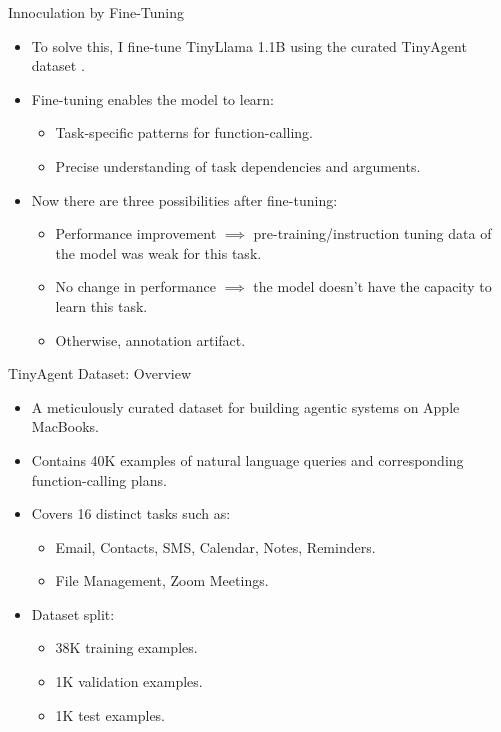 \documentclass{beamer}
\begin{document}
\begin{frame}{Innoculation by Fine-Tuning}
    \begin{itemize}
        \item To solve this, I fine-tune TinyLlama 1.1B using the curated TinyAgent dataset \citep{erdogan2024tinyagent}.
        \item Fine-tuning enables the model to learn:
        \begin{itemize}
            \item Task-specific patterns for function-calling.
            \item Precise understanding of task dependencies and arguments.
        \end{itemize}
        \item Now there are three possibilities after fine-tuning:
        \begin{itemize}
            \item Performance improvement \(\implies \) pre-training/instruction tuning data of the model was weak for this task.
            \item No change in performance \(\implies \) the model doesn't have the capacity to learn this task.
            \item Otherwise, annotation artifact.
        \end{itemize}
    \end{itemize}
\end{frame}

\begin{frame}{TinyAgent Dataset: Overview}
    \begin{itemize}
        \item A meticulously curated dataset for building agentic systems on Apple MacBooks.
        \item Contains 40K examples of natural language queries and corresponding function-calling plans.
        \item Covers 16 distinct tasks such as:
        \begin{itemize}
            \item Email, Contacts, SMS, Calendar, Notes, Reminders.
            \item File Management, Zoom Meetings.
        \end{itemize}
        \item Dataset split:
        \begin{itemize}
            \item 38K training examples.
            \item 1K validation examples.
            \item 1K test examples.
        \end{itemize}
    \end{itemize}
\end{frame}
\end{document}
